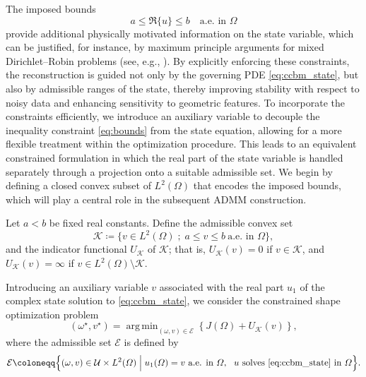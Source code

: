 \documentclass[a4paper,11pt]{article}
\DeclareMathOperator*{\argmin}{arg\,min}
\newcommand{\ur}{u_{1}}
\begin{document}
The imposed bounds 
\begin{equation}\label{eq:bounds}
a \leqslant \Re\{u\} \leqslant b  \quad \text{a.e. in } \varOmega
\end{equation}
provide additional physically motivated information on the state variable, which can be justified, for instance, by maximum principle arguments for mixed Dirichlet--Robin problems (see, e.g., \cite{Chicco1997}).
By explicitly enforcing these constraints, the reconstruction is guided not only by the governing PDE \eqref{eq:ccbm_state}, but also by admissible ranges of the state, thereby improving stability with respect to noisy data and enhancing sensitivity to geometric features.
%
To incorporate the constraints efficiently, we introduce an auxiliary variable to decouple the inequality constraint \eqref{eq:bounds} from the state equation, allowing for a more flexible treatment within the optimization procedure.
This leads to an equivalent constrained formulation in which the real part of the state variable is handled separately through a projection onto a suitable admissible set.
We begin by defining a closed convex subset of $L^{2}(\varOmega)$ that encodes the imposed bounds, which will play a central role in the subsequent ADMM construction.

Let $a<b$ be fixed real constants.
Define the admissible convex set
\begin{equation}\label{eq:admissible_set_K}
\mathcal{K}
\coloneqq
\big\{
v \in L^{2}(\varOmega)\; ;\; a \leqslant v \leqslant b \ \text{a.e. in } \varOmega
\big\},
\end{equation}
and the indicator functional $U_{\mathcal{K}}$ of $\mathcal{K}$; that is,
$U_{\mathcal{K}}(v) = 0$ if $v \in \mathcal{K}$, and $U_{\mathcal{K}}(v) = \infty$ if $v \in L^{2}(\varOmega) \setminus \mathcal{K}$.

Introducing an auxiliary variable $v$ associated with the real part $\ur$ of the complex state solution to \eqref{eq:ccbm_state}, we consider the constrained shape optimization problem
\begin{equation}\label{eq:control_Uad}
	(\omega^{\star}, v^{\star})
	=
	\argmin_{(\omega,v) \in \mathcal{E}}
	\left\{
	J({\varOmega}) + U_{\mathcal{K}}(v)
	\right\},
\end{equation}
where the admissible set $\mathcal{E}$ is defined by
\[
\mathcal{E}
\coloneqq
\Big\{
(\omega,v)\in \mathcal{U}\times L^{2}(\varOmega)
\;\Big|\;
\ur(\varOmega)=v \ \text{a.e. in } \varOmega,
\ \ u \text{ solves \eqref{eq:ccbm_state} in } \varOmega
\Big\}.
\]
\end{document}
